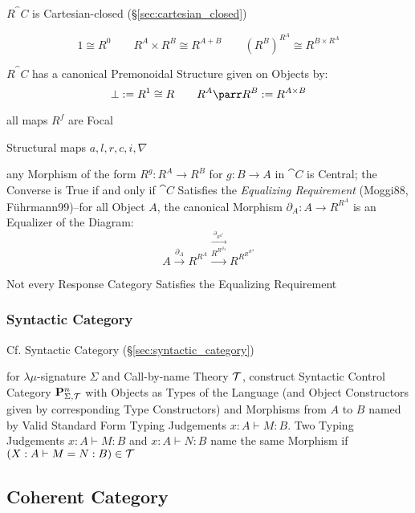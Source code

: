 $R^\cat{C}$ is Cartesian-closed (\S\ref{sec:cartesian_closed})

\[
  1 \cong R^0 \quad\quad R^A \times R^B \cong R^{A+B} \quad\quad
  (R^B)^{R^A} \cong R^{B \times R^A}
\]

$R^\cat{C}$ has a canonical Premonoidal Structure given on Objects by:
\[
  \bot := R^1 \cong R \quad\quad R^A \parr R^B := R^{A \times B}
\]

all maps $R^f$ are Focal

Structural maps $a,l,r,c,i,\nabla$

any Morphism of the form $R^g : R^A \rightarrow R^B$ for $g : B
\rightarrow A$ in $\cat{C}$ is Central; the Converse is True if and
only if $\cat{C}$ Satisfies the \emph{Equalizing Requirement}
(Moggi88, F\"uhrmann99)--for all Object $A$, the canonical Morphism
$\partial_A : A \rightarrow R^{R^A}$ is an Equalizer of the Diagram:
\[
  A \xrightarrow{\partial_A} R^{R^A}
    \stackrel{\xrightarrow{\partial_{R^{R^A}}}}
    {\xrightarrow{R^{R^{\partial_A}}}}
  R^{R^{R^{R^A}}}
\]

\fist Not every Response Category Satisfies the Equalizing Requirement



\subsubsection{Syntactic Category}\label{sec:syntactic_control_category}

\fist Cf. Syntactic Category (\S\ref{sec:syntactic_category})

for $\lambda\mu$-signature $\Sigma$ and Call-by-name Theory
$\mathcal{T}$, construct Syntactic Control Category
$\mathbf{P}^n_{\Sigma,\mathcal{T}}$ with Objects as Types of the Language
(and Object Constructors given by corresponding Type Constructors) and
Morphisms from $A$ to $B$ named by Valid Standard Form Typing
Judgements $x:A \vdash M:B$. Two Typing Judgements $x:A \vdash M:B$
and $x:A \vdash N:B$ name the same Morphism if $(X:A \vdash M=N:B) \in
\mathcal{T}$




\subsection{Coherent Category}\label{sec:coherent_category}

